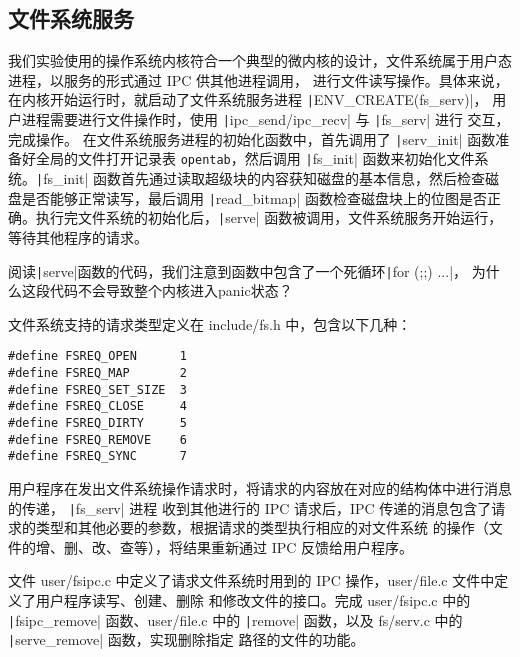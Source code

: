 \subsection{文件系统服务}

我们实验使用的操作系统内核符合一个典型的微内核的设计，文件系统属于用户态进程，以服务的形式通过 IPC 供其他进程调用，
进行文件读写操作。具体来说，在内核开始运行时，就启动了文件系统服务进程 \texttt|ENV_CREATE(fs_serv)|，
用户进程需要进行文件操作时，使用 \texttt|ipc_send/ipc_recv| 与 \texttt|fs_serv| 进行
交互，完成操作。
在文件系统服务进程的初始化函数中，首先调用了 \texttt|serv_init| 函数准备好全局的文件打开记录表
\texttt{opentab}，然后调用 \texttt|fs_init| 函数来初始化文件系统。\texttt|fs_init|
函数首先通过读取超级块的内容获知磁盘的基本信息，然后检查磁盘是否能够正常读写，最后调用 \texttt|read_bitmap|
函数检查磁盘块上的位图是否正确。执行完文件系统的初始化后，\texttt|serve| 函数被调用，文件系统服务开始运行，
等待其他程序的请求。

\begin{thinking}\label{think-fs-serve}
阅读\texttt|serve|函数的代码，我们注意到函数中包含了一个死循环\texttt|for (;;) {...}|，
为什么这段代码不会导致整个内核进入panic状态？
\end{thinking}

文件系统支持的请求类型定义在 include/fs.h 中，包含以下几种：

\begin{verbatim}
#define FSREQ_OPEN      1
#define FSREQ_MAP       2
#define FSREQ_SET_SIZE  3
#define FSREQ_CLOSE     4
#define FSREQ_DIRTY     5
#define FSREQ_REMOVE    6
#define FSREQ_SYNC      7
\end{verbatim}

用户程序在发出文件系统操作请求时，将请求的内容放在对应的结构体中进行消息的传递， \texttt|fs_serv| 进程
收到其他进行的 IPC 请求后，IPC 传递的消息包含了请求的类型和其他必要的参数，根据请求的类型执行相应的对文件系统
的操作（文件的增、删、改、查等），将结果重新通过 IPC 反馈给用户程序。

\begin{exercise}
文件 user/fsipc.c 中定义了请求文件系统时用到的 IPC 操作，user/file.c 文件中定义了用户程序读写、创建、删除
和修改文件的接口。完成 user/fsipc.c 中的 \texttt|fsipc_remove| 函数、user/file.c 中的
\texttt|remove| 函数，以及 fs/serv.c 中的 \texttt|serve_remove| 函数，实现删除指定
路径的文件的功能。
\end{exercise}

